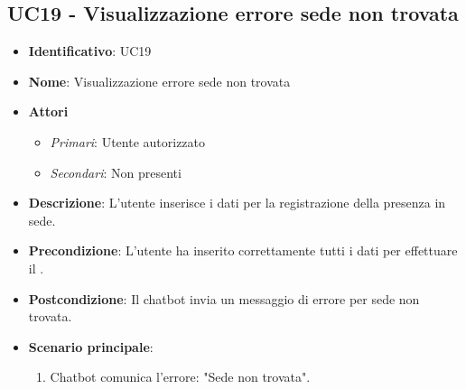 \subsection{UC19 - Visualizzazione errore sede non trovata}
\begin{itemize}
	\item \textbf{Identificativo}: UC19
	\item \textbf{Nome}:  Visualizzazione errore sede non trovata
	\item \textbf{Attori}
	\begin{itemize} 
		\item \textit{Primari}: Utente autorizzato
		\item \textit{Secondari}: Non presenti
	\end{itemize}
	\item \textbf{Descrizione}: L'utente inserisce i dati per la registrazione della presenza in sede.
	\item \textbf{Precondizione}: L'utente ha inserito correttamente tutti i dati per effettuare il .
	\item \textbf{Postcondizione}: Il chatbot invia un messaggio di errore per sede non trovata. 
	\item \textbf{Scenario principale}: \begin{enumerate}
		\item Chatbot comunica l'errore: "Sede non trovata".
	\end{enumerate}
\end{itemize}